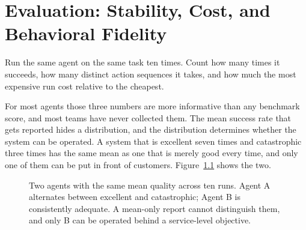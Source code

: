 \documentclass[11pt]{book}
\begin{document}

\chapter{Evaluation: Stability, Cost, and Behavioral Fidelity}
\label{ch:evaluation}

Run the same agent on the same task ten times. Count how many times it succeeds, how many distinct action sequences it takes, and how much the most expensive run cost relative to the cheapest.

For most agents those three numbers are more informative than any benchmark score, and most teams have never collected them. The mean success rate that gets reported hides a distribution, and the distribution determines whether the system can be operated. A system that is excellent seven times and catastrophic three times has the same mean as one that is merely good every time, and only one of them can be put in front of customers. Figure~\ref{fig:variance} shows the two.

\begin{figure}[htbp]
\centering
{}
\caption{Two agents with the same mean quality across ten runs. Agent A alternates between excellent and catastrophic; Agent B is consistently adequate. A mean-only report cannot distinguish them, and only B can be operated behind a service-level objective.}
\label{fig:variance}
\end{figure}
\end{document}
